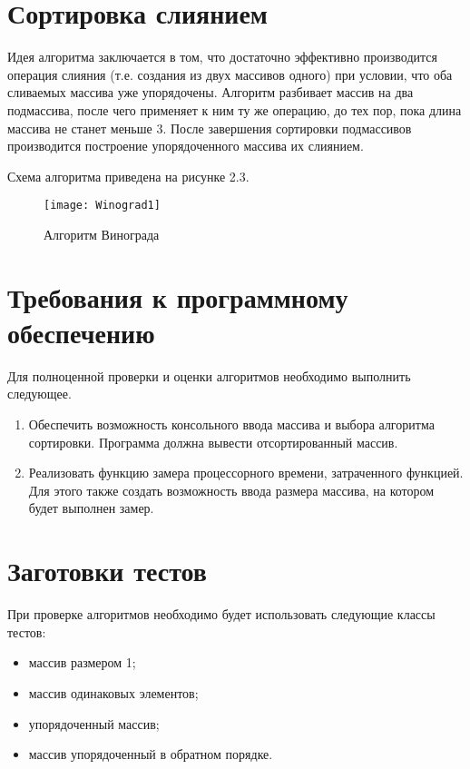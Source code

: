 \section{Сортировка слиянием}
Идея алгоритма заключается в том, что достаточно эффективно производится операция слияния (т.е. создания из двух массивов одного) при условии, что оба сливаемых массива уже упорядочены. Алгоритм разбивает массив на два подмассива, после чего применяет к ним ту же операцию, до тех пор, пока длина массива не станет меньше 3. После завершения сортировки подмассивов производится построение упорядоченного массива их слиянием.

Схема алгоритма приведена на рисунке 2.3.
\begin{figure}[h]
	\begin{center}
		{\texttt{[image: Winograd1]}}
		\caption{Алгоритм Винограда}
	\end{center}
\end{figure}


\section{Требования к программному обеспечению}
Для полноценной проверки и оценки алгоритмов необходимо выполнить следующее.
\begin{enumerate}
	\item Обеспечить возможность консольного ввода массива и выбора алгоритма сортировки. Программа должна вывести отсортированный массив.
	\item Реализовать функцию замера процессорного времени, затраченного функцией. Для этого также создать возможность ввода размера массива, на котором будет выполнен замер.
\end{enumerate}


\section{Заготовки тестов}
При проверке алгоритмов необходимо будет использовать следующие классы тестов:
\begin{itemize}
	\item массив размером 1;
	\item массив одинаковых элементов;
	\item упорядоченный массив;
	\item массив упорядоченный в обратном порядке.
\end{itemize}



